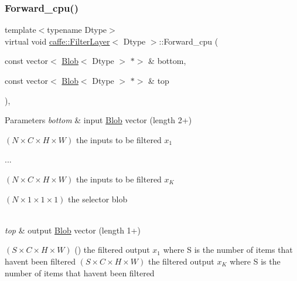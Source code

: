 \mbox{\label{classcaffe_1_1_filter_layer_a338878561cb163fc35eea6840c20f9f3}} 
\subsubsection{\texorpdfstring{Forward\+\_\+cpu()}{Forward\_cpu()}\hspace{0.1cm}{\footnotesize\ttfamily [2/2]}}
{\footnotesize\ttfamily template$<$typename Dtype$>$ \\
virtual void \mbox{\hyperlink{classcaffe_1_1_filter_layer}{caffe\+::\+Filter\+Layer}}$<$ Dtype $>$\+::Forward\+\_\+cpu (\begin{DoxyParamCaption}\item[{const vector$<$ \mbox{\hyperlink{classcaffe_1_1_blob}{Blob}}$<$ Dtype $>$ $\ast$$>$ \&}]{bottom,  }\item[{const vector$<$ \mbox{\hyperlink{classcaffe_1_1_blob}{Blob}}$<$ Dtype $>$ $\ast$$>$ \&}]{top }\end{DoxyParamCaption})\hspace{0.3cm}{\ttfamily [protected]}, {\ttfamily [virtual]}}


\begin{DoxyParams}{Parameters}
{\em bottom} & input \mbox{\hyperlink{classcaffe_1_1_blob}{Blob}} vector (length 2+)
\begin{DoxyEnumerate}
\item $ (N \times C \times H \times W) $ the inputs to be filtered $ x_1 $
\item ...
\item $ (N \times C \times H \times W) $ the inputs to be filtered $ x_K $
\item $ (N \times 1 \times 1 \times 1) $ the selector blob 
\end{DoxyEnumerate}\\
\hline
{\em top} & output \mbox{\hyperlink{classcaffe_1_1_blob}{Blob}} vector (length 1+)
\begin{DoxyEnumerate}
\item $ (S \times C \times H \times W) $ () the filtered output $ x_1 $ where S is the number of items that haven\textquotesingle{}t been filtered $ (S \times C \times H \times W) $ the filtered output $ x_K $ where S is the number of items that haven\textquotesingle{}t been filtered 
\end{DoxyEnumerate}\\
\hline
\end{DoxyParams}


